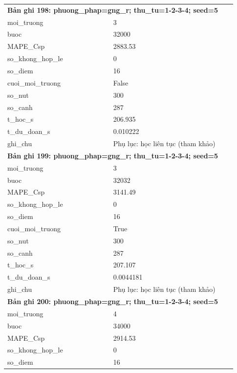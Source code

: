 \begin{longtable}{p{0.43\linewidth}p{0.50\linewidth}}
\midrule
\multicolumn{2}{p{0.95\linewidth}}{\textbf{Bản ghi 198: phuong\_phap=gng\_r; thu\_tu=1-2-3-4; seed=5}} \\
moi\_\allowbreak truong & 3 \\
buoc & 32000 \\
MAPE\_\allowbreak Csp & 2883.53 \\
so\_\allowbreak khong\_\allowbreak hop\_\allowbreak le & 0 \\
so\_\allowbreak diem & 16 \\
cuoi\_\allowbreak moi\_\allowbreak truong & False \\
so\_\allowbreak nut & 300 \\
so\_\allowbreak canh & 287 \\
t\_\allowbreak hoc\_\allowbreak s & 206.935 \\
t\_\allowbreak du\_\allowbreak doan\_\allowbreak s & 0.010222 \\
ghi\_\allowbreak chu & Phụ lục: học liên tục (tham khảo) \\
\midrule
\multicolumn{2}{p{0.95\linewidth}}{\textbf{Bản ghi 199: phuong\_phap=gng\_r; thu\_tu=1-2-3-4; seed=5}} \\
moi\_\allowbreak truong & 3 \\
buoc & 32032 \\
MAPE\_\allowbreak Csp & 3141.49 \\
so\_\allowbreak khong\_\allowbreak hop\_\allowbreak le & 0 \\
so\_\allowbreak diem & 16 \\
cuoi\_\allowbreak moi\_\allowbreak truong & True \\
so\_\allowbreak nut & 300 \\
so\_\allowbreak canh & 287 \\
t\_\allowbreak hoc\_\allowbreak s & 207.107 \\
t\_\allowbreak du\_\allowbreak doan\_\allowbreak s & 0.0044181 \\
ghi\_\allowbreak chu & Phụ lục: học liên tục (tham khảo) \\
\midrule
\multicolumn{2}{p{0.95\linewidth}}{\textbf{Bản ghi 200: phuong\_phap=gng\_r; thu\_tu=1-2-3-4; seed=5}} \\
moi\_\allowbreak truong & 4 \\
buoc & 34000 \\
MAPE\_\allowbreak Csp & 2914.53 \\
so\_\allowbreak khong\_\allowbreak hop\_\allowbreak le & 0 \\
so\_\allowbreak diem & 16 \\

\end{longtable}
